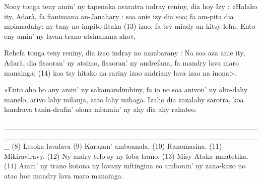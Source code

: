 Nony tonga teny amin' ny tapenaka avaratra indray reniny, dia hoy
Izy : «Halako ity, Adarà, fa fiantsoana an-Janahary : soa anie izy dia soa;
fa am-pita dia mpianadahy: ny tany no impito fitaka (13) izao, fa tsy miady
an-kitsy loha. Ento eny amin' ny lavan-trano atsinanana aho»,

Rehefa tonga teny reniny, dia izao indray no nambarany : Na soa
aza anie ity, Adarà, dia fisaoran' ny atsimo, fisaoran' ny andrefana, fa
mandry lava maro manainga; (14) koa tsy hitako na rariny izao andriany
lava izao na inona>.

«Ento aho ho any amin' ny sakamandimbiny, fa io no soa anivon' ny
alin-dahy manelo, arivo lahy milanja, zato lahy mihaga. Izaho dia zazalahy
sarotra, koa handrava tanin-drafin' olona mbamin' ny ahy dia ahy rahateo.

_________________________________________________________________________________________________
(8) Lesoka lavalava 
(9) Karazan' amboanala. 
(10) Ranomasina. 
(11) Mikiraviravy. 
(12) Ny andry telo sy ny loba-trano. 
(13) Misy Ataka mnatetika. 
(14) Amin' ny trano kotona ny lavany mítingina eo ambonin' ny zana-kazo no atao hoe mandry lava maro manainga.